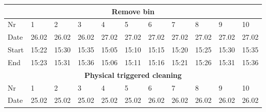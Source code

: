 \begin{table}[H]
\begin{tabular}{|lllllllllll|}
\multicolumn{11}{|c|}{\textbf{Remove bin}}                                                                                                                                                                                                                                                                \\ \hline
\multicolumn{1}{|l|}{Nr} & \multicolumn{1}{l|}{1}     & \multicolumn{1}{l|}{2}     & \multicolumn{1}{l|}{3}     & \multicolumn{1}{l|}{4}     & \multicolumn{1}{l|}{5}     & \multicolumn{1}{l|}{6}     & \multicolumn{1}{l|}{7}     & \multicolumn{1}{l|}{8}     & \multicolumn{1}{l|}{9}     & 10    \\ \hline
\multicolumn{1}{|l|}{Date}   & \multicolumn{1}{l|}{26.02} & \multicolumn{1}{l|}{26.02} & \multicolumn{1}{l|}{26.02} & \multicolumn{1}{l|}{27.02} & \multicolumn{1}{l|}{27.02} & \multicolumn{1}{l|}{27.02} & \multicolumn{1}{l|}{27.02} & \multicolumn{1}{l|}{27.02} & \multicolumn{1}{l|}{27.02} & 27.02 \\ \hline
\multicolumn{1}{|l|}{Start}  & \multicolumn{1}{l|}{15:22} & \multicolumn{1}{l|}{15:30} & \multicolumn{1}{l|}{15:35} & \multicolumn{1}{l|}{15:05} & \multicolumn{1}{l|}{15:10} & \multicolumn{1}{l|}{15:15} & \multicolumn{1}{l|}{15:20} & \multicolumn{1}{l|}{15:25} & \multicolumn{1}{l|}{15:30} & 15:35 \\ \hline
\multicolumn{1}{|l|}{End}    & \multicolumn{1}{l|}{15:23} & \multicolumn{1}{l|}{15:31} & \multicolumn{1}{l|}{15:36} & \multicolumn{1}{l|}{15:06} & \multicolumn{1}{l|}{15:11} & \multicolumn{1}{l|}{15:16} & \multicolumn{1}{l|}{15:21} & \multicolumn{1}{l|}{15:26} & \multicolumn{1}{l|}{15:31} & 15:36 \\ \hline
\multicolumn{11}{|c|}{\textbf{Physical triggered cleaning}}                                                                                                                                                                                                                                               \\ \hline
\multicolumn{1}{|l|}{Nr} & \multicolumn{1}{l|}{1}     & \multicolumn{1}{l|}{2}     & \multicolumn{1}{l|}{3}     & \multicolumn{1}{l|}{4}     & \multicolumn{1}{l|}{5}     & \multicolumn{1}{l|}{6}     & \multicolumn{1}{l|}{7}     & \multicolumn{1}{l|}{8}     & \multicolumn{1}{l|}{9}     & 10    \\ \hline
\multicolumn{1}{|l|}{Date}   & \multicolumn{1}{l|}{25.02} & \multicolumn{1}{l|}{25.02} & \multicolumn{1}{l|}{25.02} & \multicolumn{1}{l|}{25.02} & \multicolumn{1}{l|}{25.02} & \multicolumn{1}{l|}{26.02} & \multicolumn{1}{l|}{26.02} & \multicolumn{1}{l|}{26.02} & \multicolumn{1}{l|}{26.02} & 26.02 \\ \hline

\end{tabular}
\end{table}
